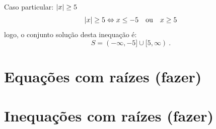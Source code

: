 \begin{exem}
   Caso particular: $\left|x\right| \geq 5$
\begin{equation}
\abs{x} \geq 5 \Leftrightarrow x \leq -5 \ \ \text{ ou } \ \ x \geq 5
\end{equation}
   logo, o conjunto solução desta inequação é:
\begin{equation}
S= (-\infty, -5] \cup [5, \infty) \ . 
\end{equation}
 \end{exem}


 \section{Equações com raízes (fazer)}

 \section{Inequações com raízes (fazer)}
